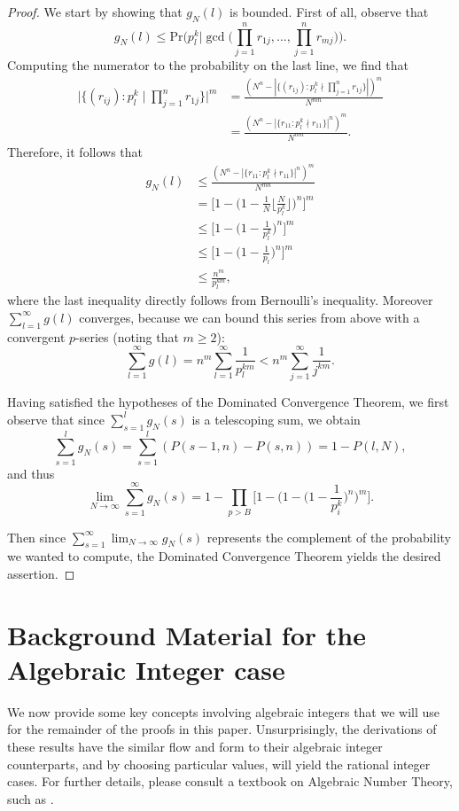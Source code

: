 \documentclass[12pt]{amsart}
\theoremstyle{definition}
\begin{document}
\begin{proof}
	We start by showing that $g_N(l)$ is bounded. First of all, observe that
	$$g_N(l) \leq \text{Pr}\Big(p_l^k \Big| \gcd\Big(\prod_{j=1}^n r_{1j}, ... , \prod_{j=1}^n r_{mj}\Big)\Big).$$
	Computing the numerator to the probability on the last line, we find that
	\begin{align*} 
		\Big|\{(r_{ij}) : p_l^k \mid \prod_{j=1}^n r_{1j}\}\Big|^m &= \frac{(N^n - |\{(r_{1j}) : p_l^k \nmid \prod_{j=1}^n r_{1j}\}|)^m}{N^{mn}}\\
		&= \frac{(N^n - |\{r_{11} : p_l^k \nmid r_{11}\}|^n)^m}{N^{mn}}. \end{align*}
	Therefore, it follows that
	\begin{align*} 
		g_N(l) &\leq \frac{(N^n - |\{r_{11} : p_l^k \nmid r_{11}\}|^n)^m}{N^{mn}}\\
		&= \Big[1 - \Big(1 - \frac{1}{N} \Big\lfloor \frac{N}{p_l^k}\Big\rfloor\Big)^n\Big]^m\\
		&\leq \Big[1 - \Big(1 - \frac{1}{p_l^k}\Big)^n\Big]^m\\
            &\leq \Big[1 - \Big(1 - \frac{1}{p_l}\Big)^n\Big]^m\\
		&\leq \frac{n^m}{p_l^{km}},\end{align*}
	where the last inequality directly follows from Bernoulli's inequality. Moreover $\sum_{l=1}^{\infty} g(l)$ converges, because we can bound this series from above with a convergent $p$-series (noting that $m \geq 2$):
	$$\sum_{l=1}^{\infty} g(l) = n^m \sum_{l=1}^{\infty} \frac{1}{p_l^{km}} < n^m \sum_{j=1}^{\infty} \frac{1}{j^{km}}.$$
	
	Having satisfied the hypotheses of the Dominated Convergence Theorem, we first observe that since $\sum_{s=1}^l g_N(s)$ is a telescoping sum, we obtain
	$$\sum_{s=1}^l g_N(s) = \sum_{s=1}^l (P(s-1, n) - P(s, n)) = 1 - P(l, N),$$ 
	and thus
	$$\lim_{N \to \infty} \sum_{s=1}^{\infty} g_N(s) = 1 - \prod_{p > B} \Big[1 - \Big(1 - \Big(1 - \frac{1}{p^k_i}  \Big)^n\Big)^m\Big].$$
	
	\noindent Then since $\displaystyle \sum_{s=1}^{\infty} \lim_{N \to \infty} g_N(s)$ represents the complement of the probability we wanted to compute, the Dominated Convergence Theorem yields the desired assertion.
\end{proof}



\section{Background Material for the Algebraic Integer case}
We now provide some key concepts involving algebraic integers that we will use for the remainder of the proofs in this paper. Unsurprisingly, the derivations of these results have the similar flow and form to their algebraic integer counterparts, and by choosing particular values, will yield the rational integer cases. For further details, please consult a textbook on Algebraic Number Theory, such as \cite{Marcus}.
\end{document}
